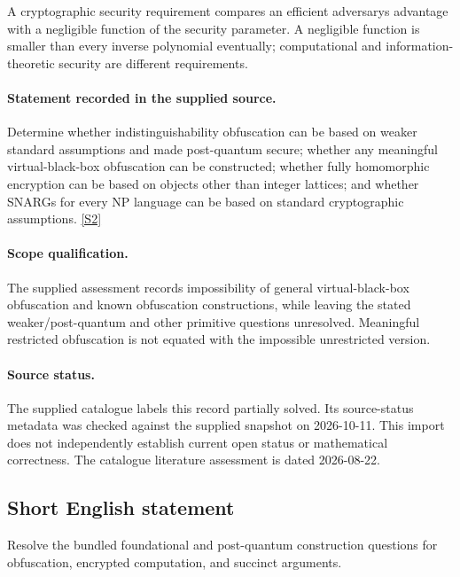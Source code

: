 \documentclass[11pt]{article}
\begin{document}
A cryptographic security requirement compares an efficient adversary\textquotesingle s advantage with a negligible function of the security parameter. A negligible function is smaller than every inverse polynomial eventually; computational and information-theoretic security are different requirements.
\paragraph{Statement recorded in the supplied source.}
Determine whether indistinguishability obfuscation can be based on weaker standard assumptions and made post-quantum secure; whether any meaningful virtual-black-box obfuscation can be constructed; whether fully homomorphic encryption can be based on objects other than integer lattices; and whether SNARGs for every NP language can be based on standard cryptographic assumptions. \href{https://doi.org/10.4171/owr/2025/3}{[S2]}
\paragraph{Scope qualification.}
The supplied assessment records impossibility of general virtual-black-box obfuscation and known obfuscation constructions, while leaving the stated weaker/post-quantum and other primitive questions unresolved. Meaningful restricted obfuscation is not equated with the impossible unrestricted version.
\paragraph{Source status.}
The supplied catalogue labels this record partially solved. Its source-status metadata was checked against the supplied snapshot on 2026-10-11. This import does not independently establish current open status or mathematical correctness. The catalogue literature assessment is dated 2026-08-22.
\subsection{Short English statement}
Resolve the bundled foundational and post-quantum construction questions for obfuscation, encrypted computation, and succinct arguments.
\end{document}
